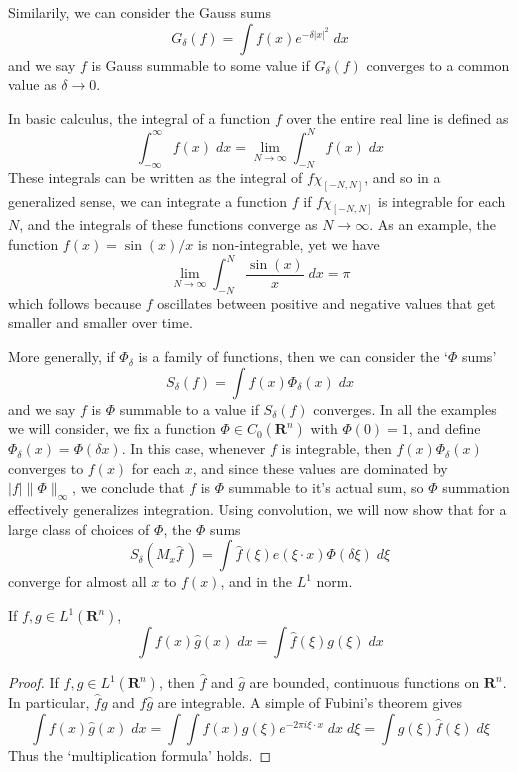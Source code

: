 \begin{example}
	Similarily, we can consider the Gauss sums
	\[ G_\delta(f) = \int f(x) e^{-\delta |x|^2}\; dx \]
	and we say $f$ is Gauss summable to some value if $G_\delta(f)$ converges to a common value as $\delta \to 0$.
\end{example}

\begin{example}
	In basic calculus, the integral of a function $f$ over the entire real line is defined as
	\[ \int_{-\infty}^\infty f(x)\; dx = \lim_{N \to \infty} \int_{-N}^N f(x)\; dx \]
	These integrals can be written as the integral of $f \chi_{[-N,N]}$, and so in a generalized sense, we can integrate a function $f$ if $f \chi_{[-N,N]}$ is integrable for each $N$, and the integrals of these functions converge as $N \to \infty$. As an example, the function $f(x) = \sin(x)/x$ is non-integrable, yet we have
	\[ \lim_{N \to \infty} \int_{-N}^N \frac{\sin(x)}{x}\; dx = \pi \]
	which follows because $f$ oscillates between positive and negative values that get smaller and smaller over time.
\end{example}

More generally, if $\Phi_\delta$ is a family of functions, then we can consider the `$\Phi$ sums'
%
\[ S_\delta(f) = \int f(x) \Phi_\delta(x)\; dx \]
%
and we say $f$ is $\Phi$ summable to a value if $S_\delta(f)$ converges. In all the examples we will consider, we fix a function $\Phi \in C_0(\mathbf{R}^n)$ with $\Phi(0) = 1$, and define $\Phi_\delta(x) = \Phi(\delta x)$. In this case, whenever $f$ is integrable, then $f(x) \Phi_\delta(x)$ converges to $f(x)$ for each $x$, and since these values are dominated by $|f| \| \Phi \|_\infty$, we conclude that $f$ is $\Phi$ summable to it's actual sum, so $\Phi$ summation effectively generalizes integration. Using convolution, we will now show that for a large class of choices of $\Phi$, the $\Phi$ sums
%
\[ S_\delta \left( M_x \widehat{f}\ \right) = \int \widehat{f}(\xi) e(\xi \cdot x) \Phi(\delta \xi)\; d\xi \]
%
converge for almost all $x$ to $f(x)$, and in the $L^1$ norm.

\begin{theorem}
	If $f,g \in L^1(\mathbf{R}^n)$,
	\[ \int f(x) \widehat{g}(x)\; dx = \int \widehat{f}(\xi) g(\xi)\; dx \]
\end{theorem}
\begin{proof}
	If $f, g \in L^1(\mathbf{R}^n)$, then $\widehat{f}$ and $\widehat{g}$ are bounded, continuous functions on $\mathbf{R}^n$. In particular, $\widehat{f} g$ and $f \widehat{g}$ are integrable. A simple of Fubini's theorem gives
	\[ \int f(x) \widehat{g}(x)\; dx = \int \int f(x) g(\xi) e^{- 2 \pi i \xi \cdot x}\; dx\; d\xi = \int g(\xi) \widehat{f}(\xi)\; d\xi \]
	Thus the `multiplication formula' holds. 
\end{proof}

